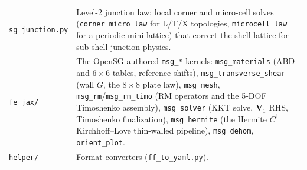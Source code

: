 \begin{table}[htbp]
\begin{tabular}{@{}lp{9.1cm}@{}}
\texttt{sg\_junction.py} &
Level-2 junction law: local corner and micro-cell solves
(\texttt{corner\_micro\_law} for L/T/X topologies, \texttt{microcell\_law} for a
periodic mini-lattice) that correct the shell lattice for sub-shell junction
physics. \\
\texttt{fe\_jax/} &
The OpenSG-authored \texttt{msg\_*} kernels: \texttt{msg\_materials}
(ABD and $6\times6$ tables, reference shifts), \texttt{msg\_transverse\_shear}
(wall $G$, the $8\times8$ plate law), \texttt{msg\_mesh},
\texttt{msg\_rm}/\texttt{msg\_rm\_timo} (RM operators and the 5-DOF Timoshenko
assembly), \texttt{msg\_solver} (KKT solve, $\mathbf{V}_1$ RHS, Timoshenko
finalization), \texttt{msg\_hermite} (the Hermite $C^1$ Kirchhoff--Love
thin-walled pipeline), \texttt{msg\_dehom}, \texttt{orient\_plot}. \\
\texttt{helper/} &
Format converters (\texttt{ff\_to\_yaml.py}). \\
\bottomrule
\end{tabular}
\end{table}

